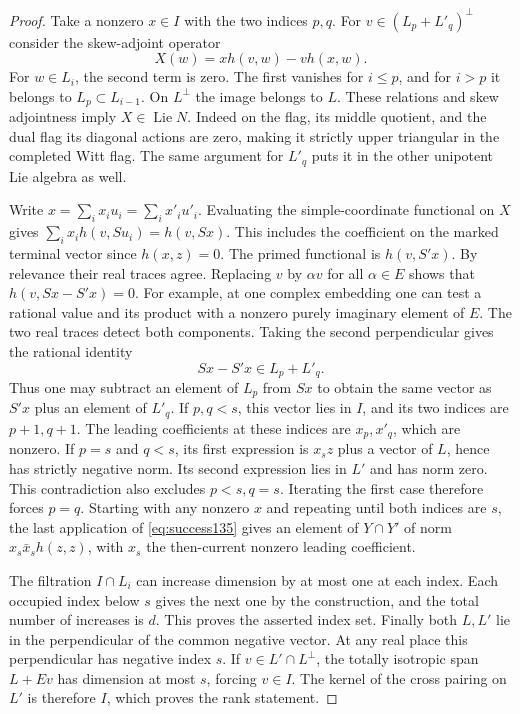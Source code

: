 \documentclass[a4paper,11pt]{article}
\theoremstyle{definition}
\theoremstyle{remark}
\numberwithin{equation}{section}
\begin{document}
\begin{proof}
Take a nonzero \(x\in I\) with the two indices \(p,q\).
For \(v\in (L_p+L'_q)^\perp\) consider the skew-adjoint operator
\[
       X(w)=x h(v,w)-v h(x,w).
\]
For \(w\in L_i\), the second term is zero. The first vanishes
for \(i\le p\), and for \(i>p\) it belongs to \(L_p\subset
L_{i-1}\). On \(L^\perp\) the image belongs to \(L\).
These relations and skew adjointness imply \(X\in\operatorname{Lie}N\).
Indeed on the flag, its middle quotient, and the dual flag its
diagonal actions are zero, making it strictly upper triangular
in the completed Witt flag. The same argument for \(L'_q\)
puts it in the other unipotent Lie algebra as well.

Write \(x=\sum_i x_i u_i=\sum_i x'_i u'_i\). Evaluating the
simple-coordinate functional on \(X\) gives
\(\sum_i x_i h(v,Su_i)=h(v,Sx)\). This includes the coefficient
on the marked terminal vector since \(h(x,z)=0\). The primed
functional is \(h(v,S'x)\). By relevance their real traces agree.
Replacing \(v\) by \(\alpha v\) for all \(\alpha\in E\) shows
that \(h(v,Sx-S'x)=0\). For example, at one complex embedding
one can test a rational value and its product with a nonzero
purely imaginary element of \(E\). The two real traces detect
both components. Taking the second perpendicular gives the
rational identity
\begin{equation}
                Sx-S'x\in L_p+L'_q .
                \label{eq:success135}
\end{equation}
Thus one may subtract an element of \(L_p\) from \(Sx\) to
obtain the same vector as \(S'x\) plus an element of \(L'_q\).
If \(p,q<s\), this vector lies in \(I\), and its two indices
are \(p+1,q+1\). The leading coefficients at these indices are
\(x_p,x'_q\), which are nonzero. If \(p=s\) and \(q<s\), its
first expression is \(x_s z\) plus a vector of \(L\), hence has
strictly negative norm. Its second expression lies in \(L'\)
and has norm zero. This contradiction also excludes \(p<s,q=s\).
Iterating the first case therefore forces \(p=q\). Starting with
any nonzero \(x\) and repeating until both indices are \(s\),
the last application of \eqref{eq:success135} gives an element
of \(Y\cap Y'\) of norm \(x_s\bar x_s h(z,z)\), with \(x_s\)
the then-current nonzero leading coefficient.

The filtration \(I\cap L_i\) can increase dimension by at most
one at each index. Each occupied index below \(s\) gives the next
one by the construction, and the total number of increases is
\(d\). This proves the asserted index set. Finally both \(L,L'\)
lie in the perpendicular of the common negative vector. At any
real place this perpendicular has negative index \(s\).
If \(v\in L'\cap L^\perp\), the totally isotropic span \(L+Ev\)
has dimension at most \(s\), forcing \(v\in I\).
The kernel of the cross pairing on \(L'\) is therefore \(I\),
which proves the rank statement.
\end{proof}
\end{document}
